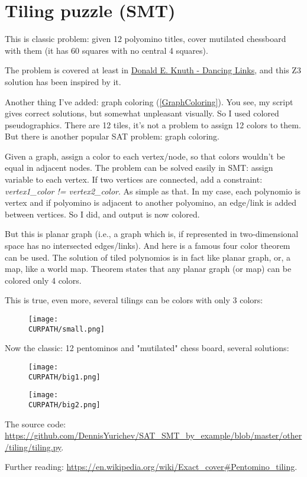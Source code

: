 \section{Tiling puzzle (SMT)}
\label{tiling_Z3}

\renewcommand{\CURPATH}{other/tiling}

This is classic problem: given 12 polyomino titles, cover mutilated chessboard with them (it has 60 squares with no central 4 squares).

The problem is covered at least in \href{https://arxiv.org/pdf/cs/0011047.pdf}{Donald E. Knuth - Dancing Links},
and this Z3 solution has been inspired by it.

Another thing I've added: graph coloring (\ref{GraphColoring}). You see, my script gives correct solutions, but somewhat unpleasant visually.
So I used colored pseudographics. There are 12 tiles, it's not a problem to assign 12 colors to them.
But there is another popular SAT problem: graph coloring.

Given a graph, assign a color to each vertex/node, so that colors wouldn't be equal in adjacent nodes.
The problem can be solved easily in SMT: assign variable to each vertex.
If two vertices are connected, add a constraint: \emph{vertex1\_color != vertex2\_color}.
As simple as that.
In my case, each polynomio is vertex and if polyomino is adjacent to another polyomino, an edge/link is added between vertices.
So I did, and output is now colored.

But this is planar graph (i.e., a graph which is, if represented in two-dimensional space has no intersected edges/links).
And here is a famous four color theorem can be used.
The solution of tiled polynomios is in fact like planar graph, or, a map, like a world map.
Theorem states that any planar graph (or map) can be colored only 4 colors.

This is true, even more, several tilings can be colors with only 3 colors:

\begin{figure}[H]
\centering
\texttt{[image: \\CURPATH/small.png]}
\caption{}
\end{figure}

Now the classic: 12 pentominos and "mutilated" chess board, several solutions:

\begin{figure}[H]
\centering
\texttt{[image: \\CURPATH/big1.png]}
\caption{}
\end{figure}

\begin{figure}[H]
\centering
\texttt{[image: \\CURPATH/big2.png]}
\caption{}
\end{figure}

The source code: \url{https://github.com/DennisYurichev/SAT_SMT_by_example/blob/master/other/tiling/tiling.py}.

Further reading: \url{https://en.wikipedia.org/wiki/Exact_cover#Pentomino_tiling}.

